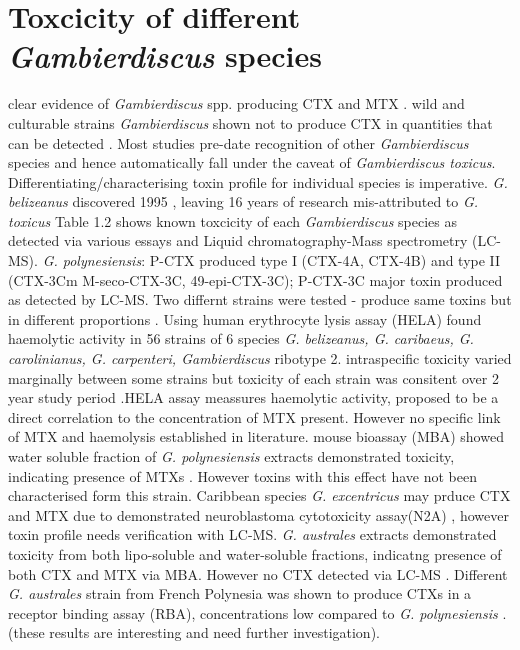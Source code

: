 \documentclass[12pt]{article}
\begin{document}
\section{Toxcicity of different \emph{Gambierdiscus} species}
clear evidence of \emph{Gambierdiscus} spp. producing CTX and MTX \cite{murata1990structures,holmes1991strain,satake1993structure,holmes1994purification,satake1996isolation}.
wild and culturable strains \emph{Gambierdiscus} shown not to produce CTX in quantities that can be detected \cite{gillespie1985significance,holmes1990toxicity}.
Most studies pre-date recognition of other \emph{Gambierdiscus} species and hence automatically fall under the caveat of \emph{Gambierdiscus toxicus}. Differentiating/characterising toxin profile for individual species is imperative. \emph{G. belizeanus} discovered 1995 \cite{faust1995observation}, leaving 16 years of research mis-attributed to \emph{G. toxicus}
Table 1.2 shows known toxcicity of each \emph{Gambierdiscus} species as detected via various essays and Liquid chromatography-Mass spectrometry (LC-MS).
\emph{G. polynesiensis}: P-CTX produced type I (CTX-4A, CTX-4B) and type II (CTX-3Cm M-seco-CTX-3C, 49-epi-CTX-3C); P-CTX-3C major toxin produced as detected by LC-MS. Two differnt strains were tested - produce same toxins but in different proportions \cite{chinain2010growth}.
Using human erythrocyte lysis assay (HELA) found haemolytic activity in 56 strains of 6 species \emph{G. belizeanus, G. caribaeus, G. carolinianus, G. carpenteri, Gambierdiscus} ribotype 2. intraspecific toxicity varied marginally between some strains but toxicity of each strain was consitent over 2 year study period \cite{holland2013differences}.HELA assay meassures haemolytic activity, proposed to be a direct correlation to the concentration of MTX present. However no specific link of MTX and haemolysis established in literature. %
mouse bioassay (MBA) showed water soluble fraction of \emph{G. polynesiensis} extracts demonstrated toxicity, indicating presence of MTXs \cite{chinain1999morphology}. However toxins with this effect have not been characterised form this strain. %
Caribbean species \emph{G. excentricus} may prduce CTX and MTX due to demonstrated neuroblastoma cytotoxicity assay(N2A) \cite{fraga2011gambierdiscus}, however toxin profile needs verification with LC-MS.
\emph{G. australes} extracts demonstrated toxicity from both lipo-soluble and water-soluble fractions, indicatng presence of both CTX and MTX via MBA. However no CTX detected via LC-MS \cite{rhodes2010toxic}.
Different \emph{G. australes} strain from French Polynesia was shown to produce CTXs in a receptor binding assay (RBA), concentrations low compared to \emph{G. polynesiensis} \cite{chinain2010growth}. (these results are interesting and need further investigation).
\end{document}
